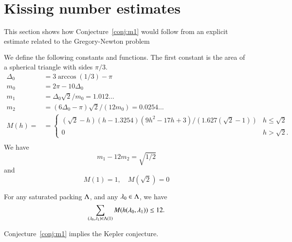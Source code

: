 \section{Kissing number estimates}

This section shows how Conjecture~\ref{conj:m1} would follow from an explicit estimate
related to the Gregory-Newton problem


We define the following constants and functions.  The first constant
is the area of a spherical triangle with sides $\pi/3$.
$$
\begin{array}{lll}
\Delta_0 &= 3\arccos(1/3)-\pi\\
m_0 &= 2\pi - 10\Delta_0\\
m_1 &= \Delta_0\sqrt2/m_0 = 1.012\ldots \\ %
m_2  &= (6\Delta_0- \pi)\sqrt2/(12 m_0) = 0.0254\ldots\\ %
M(h) = &=
\begin{cases}
 (\sqrt2-h) (h-1.3254) (9h^2 - 17 h + 3)/(1.627 (\sqrt2-1))& h\le\sqrt2\\
 0 & h >\sqrt2.
\end{cases}
\\
\end{array}
$$
We have 
\begin{equation}\label{eqn:km}m_1 - 12m_2 = \sqrt{1/2}\end{equation}
and
\begin{equation}M(1) = 1,\quad M(\sqrt2) =0\end{equation}


\begin{conjecture}[Marchal]\label{conj:m1} For any saturated packing $\Lambda$, and
any $\lambda_0\in\Lambda$, we have
$$
\sum_{(\lambda_0,\lambda_1)\in\Lambda(1)} M(h(\lambda_0,\lambda_1)) \le 12.
$$
\end{conjecture}

\begin{theorem}\label{theorem:mk}
Conjecture~\ref{conj:m1} implies the Kepler conjecture.
\end{theorem}

